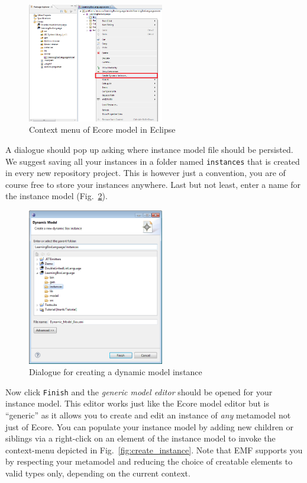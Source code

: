 \begin{figure}[htbp]
	\centering 
  \includegraphics[width=0.53\textwidth]{pics/modelBrowserBilder/createInstance.png} 
	\caption{Context menu of Ecore model in Eclipse}
	\label{fig:context_menu}
\end{figure}

A dialogue should pop up asking where instance model file should be persisted.
We suggest saving all your instances in a folder named \texttt{instances} that
is created in every new repository project.
This is however just a convention, you are of course free to store your
instances anywhere.
Last but not least, enter a name for the instance model
(Fig.~\ref{fig:store_dynamic_instance}). 

\begin{figure}[htbp]
	\centering 
  \includegraphics[width=0.53\textwidth]{pics/modelBrowserBilder/persistDialog.png} 
	\caption{Dialogue for creating a dynamic model instance}
	\label{fig:store_dynamic_instance}
\end{figure}
 
Now click \texttt{Finish} and the \emph{generic model editor} should be opened
for your instance model. 
This editor works just like the Ecore model editor but is ``generic'' as it
allows you to create and edit an instance of \emph{any} metamodel not just of
Ecore.
You can populate your instance model by adding new children or siblings via a
right-click on an element of the instance model to invoke the context-menu
depicted in Fig.~\ref{fig:create_instance}.
Note that EMF supports you by respecting your metamodel and reducing the choice
of creatable elements to valid types only, depending on the current context. 


